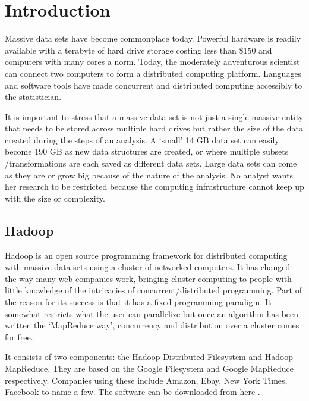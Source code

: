 \documentclass[letterpaper,10pt,english]{sphinxmanual}
\begin{document}
\chapter{Introduction}
\label{introduction:introduction}\label{introduction::doc}
Massive data sets have become commonplace today. Powerful hardware is readily
available with a terabyte of hard drive storage costing less than \$150 and
computers with many cores a norm. Today, the moderately adventurous scientist
can connect two computers to form a distributed computing platform. Languages
and software tools have made concurrent and distributed computing accessibly to
the statistician.

It is important to stress that a massive data set is not just a single massive
entity that needs to be stored across multiple hard drives but rather the size
of the data created during the steps of an analysis. A `small' 14 GB data set
can easily become 190 GB as new data structures are created, or where multiple
subsets /transformations are each saved as different data sets. Large data sets
can come as they are or grow big because of the nature of the analysis. No analyst
wants her research to be restricted because the computing infrastructure cannot
keep up with the size or complexity.


\section{Hadoop}
\label{introduction:hadoop}
Hadoop is an open source programming framework for distributed computing with
massive data sets using a cluster of networked computers. It has changed the way
many web companies work, bringing cluster computing to people with little
knowledge of the intricacies of concurrent/distributed programming. Part of the
reason for its success is that it has a fixed programming paradigm. It somewhat
restricts what the user can parallelize but once an algorithm has been written
the `MapReduce way', concurrency and distribution over a cluster comes for free.

It consists of two components: the Hadoop Distributed Filesystem and Hadoop
MapReduce. They are based on the Google Filesystem and Google MapReduce
respectively. Companies using these include Amazon, Ebay, New York Times,
Facebook to name a few. The software can be downloaded from \href{http://hadoop.apache.org/}{here} .
\end{document}
